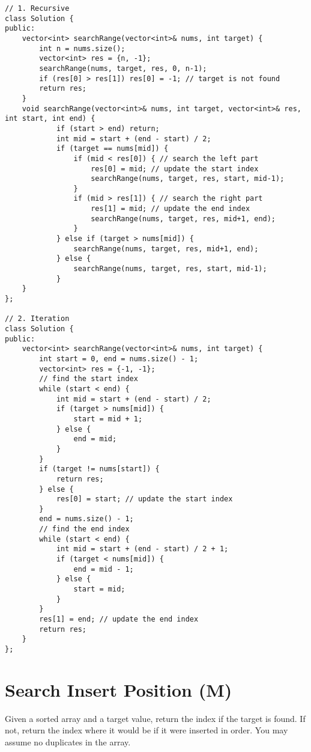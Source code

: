 \begin{lstlisting}
// 1. Recursive
class Solution {
public:
    vector<int> searchRange(vector<int>& nums, int target) {
        int n = nums.size();
        vector<int> res = {n, -1};
        searchRange(nums, target, res, 0, n-1);
        if (res[0] > res[1]) res[0] = -1; // target is not found
        return res;
    }
    void searchRange(vector<int>& nums, int target, vector<int>& res, int start, int end) {
            if (start > end) return;
            int mid = start + (end - start) / 2;
            if (target == nums[mid]) {
                if (mid < res[0]) { // search the left part
                    res[0] = mid; // update the start index
                    searchRange(nums, target, res, start, mid-1);
                }
                if (mid > res[1]) { // search the right part
                    res[1] = mid; // update the end index
                    searchRange(nums, target, res, mid+1, end);
                }
            } else if (target > nums[mid]) { 
                searchRange(nums, target, res, mid+1, end);
            } else {
                searchRange(nums, target, res, start, mid-1);
            }
    }
};

// 2. Iteration
class Solution {
public:
    vector<int> searchRange(vector<int>& nums, int target) {
        int start = 0, end = nums.size() - 1;
        vector<int> res = {-1, -1};
        // find the start index
        while (start < end) {
            int mid = start + (end - start) / 2;
            if (target > nums[mid]) {
                start = mid + 1;
            } else {
                end = mid;
            }
        }
        if (target != nums[start]) {
            return res;
        } else {
            res[0] = start; // update the start index
        }
        end = nums.size() - 1;
        // find the end index
        while (start < end) {
            int mid = start + (end - start) / 2 + 1;
            if (target < nums[mid]) {
                end = mid - 1;
            } else {
                start = mid;
            }
        }
        res[1] = end; // update the end index
        return res;
    }
};
\end{lstlisting}


\section{Search Insert Position (M)}
Given a sorted array and a target value, return the index if the target is found. If not, return the index where it would be if it were inserted in order. 
You may assume no duplicates in the array.\\

